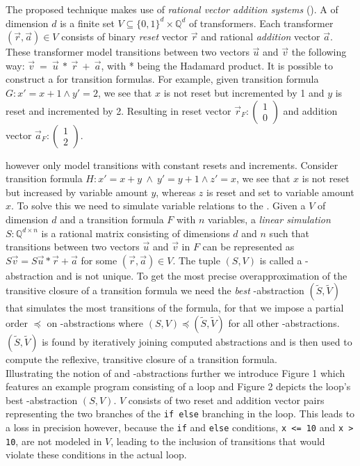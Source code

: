 The proposed technique makes use of \textsl{rational vector addition systems} (\qvasr). A \qvasr of dimension $d$ is a finite set $V \subseteq \{0, 1\}^d \times \mathbb{Q}^d$ of transformers. Each transformer $(\vec{r}, \vec{a}) \in V$ consists of binary \textsl{reset} vector $\vec{r}$ and rational \textsl{addition} vector $\vec{a}$. These transformer model transitions between two vectors $\vec{u}$ and $\vec{v}$ the following way: $\vec{v}\ =\ \vec{u}\ *\ \vec{r}\ +\ \vec{a}$, with * being the Hadamard product. It is possible to construct a \qvasr for transition formulas. For example, given transition formula $G: x' = x + 1 \land y' = 2$, we see that $x$ is not reset but incremented by 1 and $y$ is reset and incremented by 2. Resulting in reset vector $\vec{r}_F: \begin{pmatrix} 1 \\ 0\end{pmatrix}$ and addition vector $\vec{a}_F: \begin{pmatrix} 1 \\ 2\end{pmatrix}$. \par
\qvasr however only model transitions with constant resets and increments. Consider transition formula $H: x' = x + y\ \land\ y' = y + 1 \land z' = x$, we see that $x$ is not reset but increased by variable amount $y$, whereas $z$ is reset and set to variable amount $x$. To solve this we need to simulate variable relations to the \qvasr. Given a \qvasr $V$ of dimension $d$ and a transition formula $F$ with $n$ variables, a \textsl{linear simulation} $S: \mathbb{Q}^{d \times n} $ is a rational matrix consisting of dimensions $d$ and $n$ such that transitions between two vectors $\vec{u}$ and $\vec{v}$ in $F$ can be represented as $S\vec{v} = S\vec{u} * \vec{r} + \vec{a}$ for some $(\vec{r}, \vec{a}) \in V$. The tuple $(S, V)$ is called a \qvasr-abstraction and is not unique. To get the most precise overapproximation of the transitive closure of a transition formula we need the \textsl{best} \qvasr-abstraction $(\tilde{S}, \tilde{V})$ that simulates the most transitions of the formula, for that we impose a partial order $\preceq$ on \qvasr-abstractions where $(S, V) \preceq (\tilde{S}, \tilde{V})$ for all other \qvasr-abstractions. $(\tilde{S}, \tilde{V})$ is found by iteratively joining computed abstractions and is then used to compute the reflexive, transitive closure of a transition formula. \\ Illustrating the notion of \qvasr and \qvasr-abstractions further we introduce Figure 1 which features an example program consisting of a loop and Figure 2 depicts the loop's best \qvasr-abstraction $(S,V)$. $V$ consists of two reset and addition vector pairs representing the two branches of the \texttt{if else} branching in the loop. This leads to a loss in precision however, because the \texttt{if} and \texttt{else} conditions, \texttt{x <= 10} and \texttt{x > 10}, are not modeled in $V$, leading to the inclusion of transitions that would violate these conditions in the actual loop. \\
